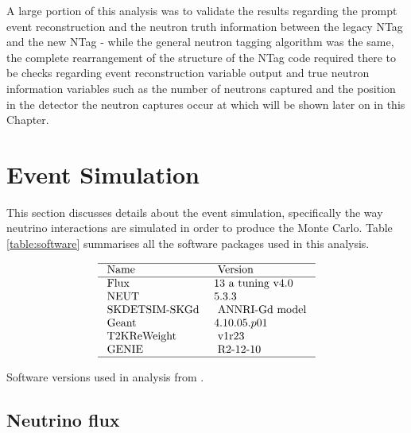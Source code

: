 A large portion of this analysis was to validate the results regarding the prompt event reconstruction and the neutron truth information between the legacy NTag and the new NTag - while the general neutron tagging algorithm was the same, the complete rearrangement of the structure of the NTag code required there to be checks regarding event reconstruction variable output and true neutron information variables such as the number of neutrons captured and the position in the detector the neutron captures occur at which will be shown later on in this Chapter. 

\section{Event Simulation}

This section discusses details about the event simulation, specifically the way neutrino interactions are simulated in order to produce the Monte Carlo. Table \ref{table:software} summarises all the software packages used in this analysis. 


\begin{table}
$$
\begin{array}{ll}
\hline \text { Name } & \text { Version } \\
\hline \text { Flux } & 13 \text { a tuning v4.0 } \\
\text { NEUT } & 5.3 .3 \\
\text { SKDETSIM-SKGd } & \text { ANNRI-Gd model } \\
\text { Geant } & 4.10.05.p01 \\
\text { T2KReWeight } & \text { v1r23 } \\
\text { GENIE } & \text { R2-12-10 } \\
\hline
\end{array}
$$
\caption{Software versions used in analysis from \cite{tn415_fiacob}.}
\label{table:software}
\end{table}

\subsection{Neutrino flux}

